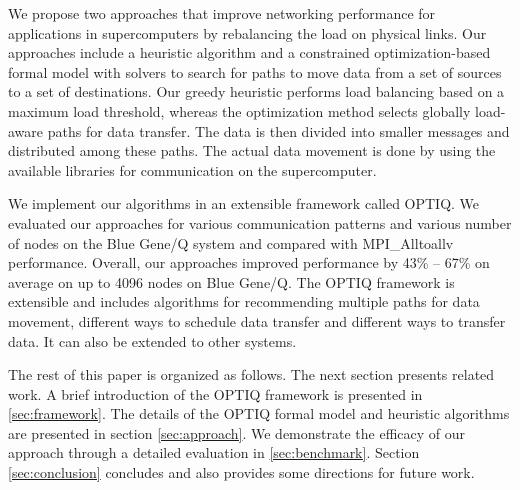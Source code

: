 We propose two approaches that improve networking performance for applications in supercomputers by rebalancing the load on physical links. Our approaches include a heuristic algorithm and a constrained optimization-based formal model with solvers to search for paths to move data from a set of sources to a set of destinations. Our greedy heuristic performs load balancing based on a maximum load threshold, whereas the optimization method selects globally load-aware paths for data transfer. The data is then divided into smaller messages and distributed among these paths. The actual data movement is done by using the available libraries for communication on the supercomputer. 

We implement our algorithms in an extensible framework called OPTIQ. 
We evaluated our approaches for various communication patterns and various number of nodes on the Blue Gene/Q system and compared with MPI\_Alltoallv performance. Overall, our approaches improved performance by 43\% -- 67\% on average on up to 4096 nodes on Blue Gene/Q. The OPTIQ framework is extensible and includes algorithms for recommending multiple paths for data movement, different ways to schedule data transfer and different ways to transfer data. It can also be extended to other systems.

The rest of this paper is organized as follows. 
The next section presents related work. A brief introduction of the OPTIQ framework is presented in \ref{sec:framework}. The details of the OPTIQ formal model and heuristic algorithms are presented in section \ref{sec:approach}. We demonstrate the efficacy of our approach through a detailed evaluation in \ref{sec:benchmark}. Section \ref{sec:conclusion} concludes and also provides some directions for future work.
